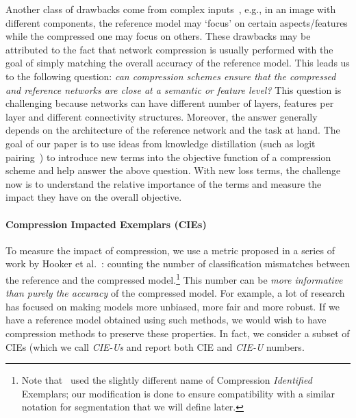 Another class of drawbacks come from complex inputs~\cite{kendall2017uncertainties,wilmanski2016complex}, e.g., in an image with different components, the reference model may `focus' on certain aspects/features while the compressed one may focus on others. 
These drawbacks may be attributed to the fact that network compression is usually performed with the goal of simply matching the overall accuracy of the reference model. This leads us to the following question: {\em can  compression schemes ensure that the compressed and reference networks are close at a semantic or feature level?}
This question is challenging because networks can have different number of layers, features per layer and different connectivity structures. Moreover, the answer generally depends on the architecture of the reference network and the task at hand. The goal of our paper is to use ideas from knowledge distillation (such as logit pairing~\cite{ba2014do, hinton2015distilling}) to introduce new terms into the objective function of a compression scheme and help answer the above question. With new loss terms, the challenge now is to understand the relative importance of the terms and measure the impact they have on the overall objective.

\paragraph{Compression Impacted Exemplars (CIEs)} To measure the impact of compression, we use a metric proposed in a series of work by Hooker et al.~\cite{hooker2020characterising}: counting the number of classification mismatches between the reference and the compressed model.\footnote{\label{footnote:cie-cie}Note that~\cite{hooker2020characterising} used the slightly different name of Compression {\em Identified} Exemplars; our modification is done to ensure compatibility with a similar notation for segmentation that we will define later.} This number can be {\em more informative than purely the accuracy} of the compressed model. For example, a lot of research has focused on making models more unbiased, more fair and more robust. If we have a reference model obtained using such methods, we would wish to have compression methods to preserve these properties. In fact, we consider a subset of CIEs (which we call \textit{CIE-Us} and report both CIE and \textit{CIE-U} numbers.

